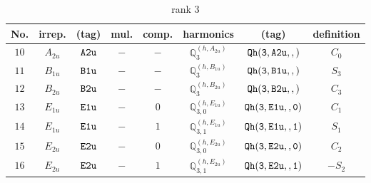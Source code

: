 \documentclass[fleqn,8pt]{jsarticle}
\begin{document}
\begin{table}[ht!]
\begin{center}
\caption{rank 3}
\renewcommand{\arraystretch}{1.3}
\begin{tabular}{cccccccc} \hline \hline
No. & irrep. & (tag) & mul. & comp. & harmonics & (tag) & definition \\ \hline
$ 10 $ & $ A_{2u} $ & $ {\tt A2u} $ & $ - $ & $ - $ & $ \mathbb{Q}_{3}^{(h,A_{2u})} $ & $ {\tt Qh(3,A2u,,)} $ & $ C_{0} $ \\
$ 11 $ & $ B_{1u} $ & $ {\tt B1u} $ & $ - $ & $ - $ & $ \mathbb{Q}_{3}^{(h,B_{1u})} $ & $ {\tt Qh(3,B1u,,)} $ & $ S_{3} $ \\
$ 12 $ & $ B_{2u} $ & $ {\tt B2u} $ & $ - $ & $ - $ & $ \mathbb{Q}_{3}^{(h,B_{2u})} $ & $ {\tt Qh(3,B2u,,)} $ & $ C_{3} $ \\
$ 13 $ & $ E_{1u} $ & $ {\tt E1u} $ & $ - $ & $ 0 $ & $ \mathbb{Q}_{3,0}^{(h,E_{1u})} $ & $ {\tt Qh(3,E1u,,0)} $ & $ C_{1} $ \\
$ 14 $ & $ E_{1u} $ & $ {\tt E1u} $ & $ - $ & $ 1 $ & $ \mathbb{Q}_{3,1}^{(h,E_{1u})} $ & $ {\tt Qh(3,E1u,,1)} $ & $ S_{1} $ \\
$ 15 $ & $ E_{2u} $ & $ {\tt E2u} $ & $ - $ & $ 0 $ & $ \mathbb{Q}_{3,0}^{(h,E_{2u})} $ & $ {\tt Qh(3,E2u,,0)} $ & $ C_{2} $ \\
$ 16 $ & $ E_{2u} $ & $ {\tt E2u} $ & $ - $ & $ 1 $ & $ \mathbb{Q}_{3,1}^{(h,E_{2u})} $ & $ {\tt Qh(3,E2u,,1)} $ & $ - S_{2} $ \\
 \hline \hline
\end{tabular}
\end{center}
\end{table}
\end{document}
